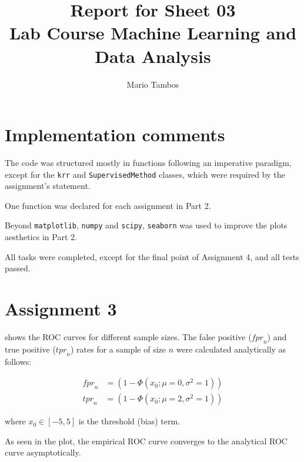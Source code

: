 \documentclass[a4paper,11pt]{article}
\begin{document}
\author{Mario Tambos}
\title{\vspace{-2cm}Report for Sheet 03\\
\small{Lab Course Machine Learning and Data Analysis}}
\maketitle

\section*{Implementation comments}
The code was structured mostly in functions following an imperative paradigm,
except for the \verb|krr| and \verb|SupervisedMethod| classes, which were required by the assignment's statement.

One function was declared for each assignment in Part 2.

Beyond \verb|matplotlib|, \verb|numpy| and \verb|scipy|, \verb|seaborn| was used to improve the plots aesthetics in Part 2.

All tasks were completed, except for the final point of Assignment 4, and all tests passed.
 
\section*{Assignment 3}

 shows the ROC curves for different sample sizes.
The false positive (${fpr}_n$) and true positive (${tpr}_n$) rates for a sample of size $n$ were calculated analytically as follows:

\begin{align*}
	{fpr}_n &= (1 - \Phi(x_0; \mu=0, \sigma^2=1))\\
	{tpr}_n &= (1 - \Phi(x_0; \mu=2, \sigma^2=1))
\end{align*}

where $x_0 \in [-5, 5]$ is the threshold (bias) term.

As seen in the plot, the empirical ROC curve converges to the analytical ROC curve asymptotically.
\end{document}
